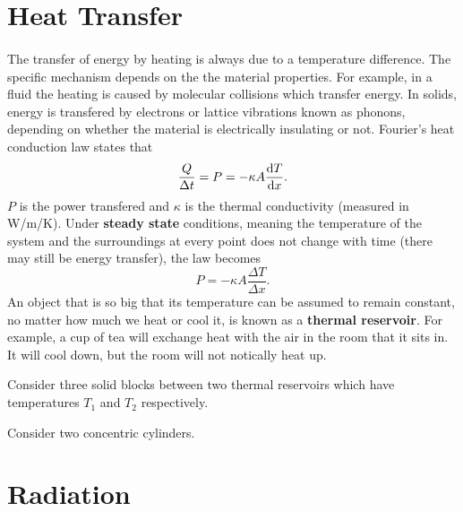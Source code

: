 \documentclass[../thermodynamics.tex]{subfiles}
\begin{document}
    \section{Heat Transfer}
        \paragraph{}
        The transfer of energy by heating is always due to a temperature difference.
        The specific mechanism depends on the the material properties.
        For example, in a fluid the heating is caused by molecular collisions which transfer energy.
        In solids, energy is transfered by electrons or lattice vibrations known as phonons, depending on whether the material is electrically insulating or not.
        Fourier's heat conduction law states that
        \begin{equation}
            \frac{Q}{\Delta t}=P=-\kappa A\dv{T}{x}.
        \end{equation}
        $P$ is the power transfered and $\kappa$ is the thermal conductivity (measured in W/m/K).
        Under \textbf{steady state} conditions, meaning the temperature of the system and the surroundings at every point does not change with time (there may still be energy transfer), the law becomes
        \begin{equation}
            P=-\kappa A\frac{\Delta T}{\Delta x}.
        \end{equation}
        An object that is so big that its temperature can be assumed to remain constant, no matter how much we heat or cool it, is known as a \textbf{thermal reservoir}.
        For example, a cup of tea will exchange heat with the air in the room that it sits in. It will cool down, but the room will not notically heat up.
        \begin{example}
            Consider three solid blocks between two thermal reservoirs which have temperatures $T_1$ and $T_2$ respectively.
        \end{example}
        \begin{example}
            Consider two concentric cylinders.
        \end{example}

    \section{Radiation}
\end{document}
